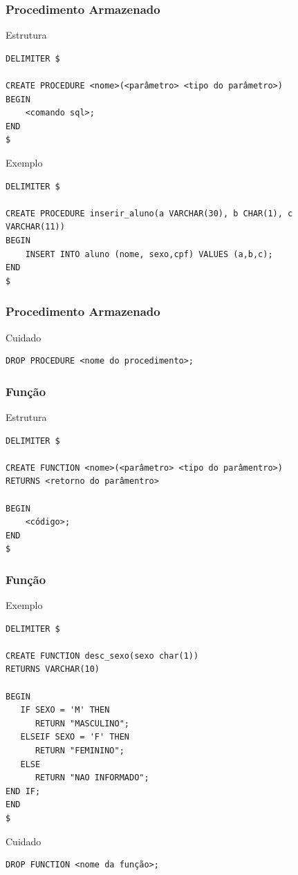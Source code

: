 \documentclass{beamer}
\begin{document}
\begin{frame}[fragile]
\frametitle{Procedimento Armazenado}

\begin{block}{Estrutura}
	\begin{lstlisting}
DELIMITER $

CREATE PROCEDURE <nome>(<parâmetro> <tipo do parâmetro>)
BEGIN
    <comando sql>;
END
$
	\end{lstlisting}
\end{block}\vfill

\begin{exampleblock}{Exemplo}
	\begin{lstlisting}
DELIMITER $

CREATE PROCEDURE inserir_aluno(a VARCHAR(30), b CHAR(1), c VARCHAR(11))
BEGIN
    INSERT INTO aluno (nome, sexo,cpf) VALUES (a,b,c);
END
$	\end{lstlisting}
\end{exampleblock}
\end{frame}

\begin{frame}[fragile]
\frametitle{Procedimento Armazenado}

\begin{alertblock}{Cuidado}
	\begin{lstlisting}
DROP PROCEDURE <nome do procedimento>;
	\end{lstlisting}
\end{alertblock}
\end{frame}

\begin{frame}[fragile]
\frametitle{Função}

\begin{block}{Estrutura}
	\begin{lstlisting}
DELIMITER $

CREATE FUNCTION <nome>(<parâmetro> <tipo do parâmentro>) 
RETURNS <retorno do parâmentro>

BEGIN
    <código>;
END
$
	\end{lstlisting}
\end{block}
\end{frame}

\begin{frame}[fragile]
\frametitle{Função}

\begin{exampleblock}{Exemplo}
	\begin{lstlisting}
DELIMITER $
	
CREATE FUNCTION desc_sexo(sexo char(1)) 
RETURNS VARCHAR(10)

BEGIN
   IF SEXO = 'M' THEN
      RETURN "MASCULINO";
   ELSEIF SEXO = 'F' THEN
      RETURN "FEMININO"; 
   ELSE 
      RETURN "NAO INFORMADO";
END IF;
END
$
	\end{lstlisting}
\end{exampleblock}\vfill

\begin{alertblock}{Cuidado}
	\begin{lstlisting}
DROP FUNCTION <nome da função>;
	\end{lstlisting}
\end{alertblock}
\end{frame}
\end{document}
